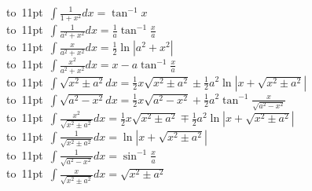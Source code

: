 \begin{footnotesize}
\noindent
\mbox{\vbox to 11pt{  \hbox{$
\int \frac{1}{1+x^2}dx = \tan^{-1}x
$}  }}
\\

\mbox{\vbox to 11pt{  \hbox{$
\int \frac{1}{a^2+x^2}dx = \frac{1}{a}\tan^{-1}\frac{x}{a}
$}  }}
\\

\mbox{\vbox to 11pt{  \hbox{$
\int \frac{x}{a^2+x^2}dx = \frac{1}{2}\ln|a^2+x^2|
$}  }}
\\

\mbox{\vbox to 11pt{  \hbox{$
\int \frac{x^2}{a^2+x^2}dx = x-a\tan^{-1}\frac{x}{a}
$}  }}
\\

\mbox{\vbox to 11pt{  \hbox{$
\int\sqrt{x^2 \pm a^2} dx  = \frac{1}{2}x\sqrt{x^2\pm a^2} 
\pm\frac{1}{2}a^2 \ln \left | x + \sqrt{x^2\pm a^2} \right | 
$}  }}
\\
\mbox{\vbox to 11pt{  \hbox{$
\int  \sqrt{a^2 - x^2} dx  = \frac{1}{2} x \sqrt{a^2-x^2} 
+\frac{1}{2}a^2\tan^{-1}\frac{x}{\sqrt{a^2-x^2}}
$}  }}
\\
\mbox{\vbox to 11pt{  \hbox{$
\int \frac{x^2}{\sqrt{x^2 \pm a^2}} dx  = \frac{1}{2}x\sqrt{x^2 \pm a^2}
\mp \frac{1}{2}a^2 \ln \left| x + \sqrt{x^2\pm a^2} \right | 
$}  }}
\\

\mbox{\vbox to 11pt{  \hbox{$
\int \frac{1}{\sqrt{x^2 \pm a^2}} dx = \ln \left | x + \sqrt{x^2 \pm a^2} \right | 
$}  }}
\\

\mbox{\vbox to 11pt{  \hbox{$
\int \frac{1}{\sqrt{a^2 - x^2}} dx = \sin^{-1}\frac{x}{a} 
$}  }}
\\

\mbox{\vbox to 11pt{  \hbox{$
\int \frac{x}{\sqrt{x^2\pm a^2}}dx = \sqrt{x^2 \pm a^2} 
$}  }}
\\


\end{footnotesize}
